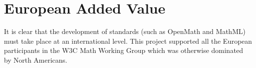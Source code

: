 \chapter{European Added Value}

It is clear that the development of standards (such as OpenMath and
MathML) must take place at an international level.  This project
supported all the European participants in the W3C Math Working Group
which was otherwise dominated by North Americans.

